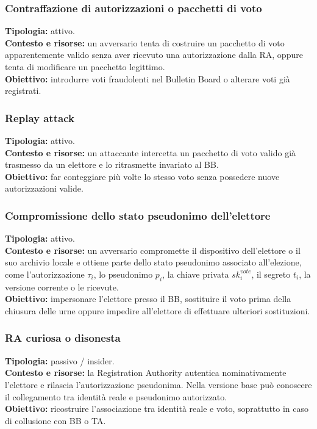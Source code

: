\documentclass[12pt,a4paper]{article}
\begin{document}
\subsubsection*{Contraffazione di autorizzazioni o pacchetti di voto}
\textbf{Tipologia:} attivo.\\
\textbf{Contesto e risorse:} un avversario tenta di costruire un pacchetto di voto apparentemente valido senza aver ricevuto una autorizzazione dalla RA, oppure tenta di modificare un pacchetto legittimo.\\
\textbf{Obiettivo:} introdurre voti fraudolenti nel Bulletin Board o alterare voti gi\`a registrati.\\


\subsubsection*{Replay attack}
\textbf{Tipologia:} attivo.\\
\textbf{Contesto e risorse:} un attaccante intercetta un pacchetto di voto valido gi\`a trasmesso da un elettore e lo ritrasmette invariato al BB.\\
\textbf{Obiettivo:} far conteggiare pi\`u volte lo stesso voto senza possedere nuove autorizzazioni valide.\\


\subsubsection*{Compromissione dello stato pseudonimo dell'elettore}
\textbf{Tipologia:} attivo.\\
\textbf{Contesto e risorse:} un avversario compromette il dispositivo dell'elettore o il suo archivio locale e ottiene parte dello stato pseudonimo associato all'elezione, come l'autorizzazione $\tau_i$, lo pseudonimo $p_i$, la chiave privata $sk_i^{vote}$, il segreto $t_i$, la versione corrente o le ricevute.\\
\textbf{Obiettivo:} impersonare l'elettore presso il BB, sostituire il voto prima della chiusura delle urne oppure impedire all'elettore di effettuare ulteriori sostituzioni.\\


\subsubsection*{RA curiosa o disonesta}
\textbf{Tipologia:} passivo / insider.\\
\textbf{Contesto e risorse:} la Registration Authority autentica nominativamente l'elettore e rilascia l'autorizzazione pseudonima. Nella versione base pu\`o conoscere il collegamento tra identit\`a reale e pseudonimo autorizzato.\\
\textbf{Obiettivo:} ricostruire l'associazione tra identit\`a reale e voto, soprattutto in caso di collusione con BB o TA.\\
\end{document}
